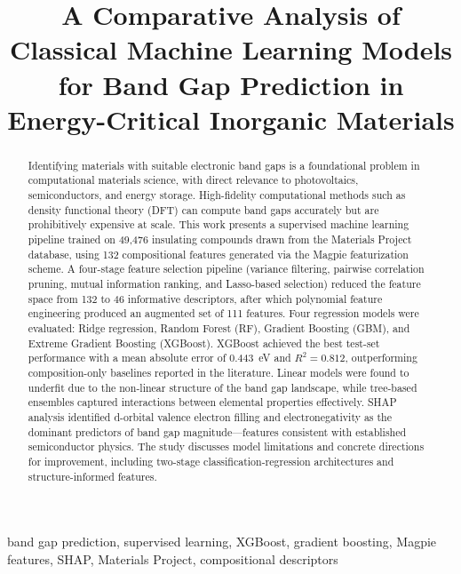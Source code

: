 \documentclass[conference]{IEEEtran}
\begin{document}
\title{A Comparative Analysis of Classical Machine Learning Models for Band Gap Prediction in Energy-Critical Inorganic Materials}

\author{
  \and
  \and
}


\maketitle

\begin{abstract}
Identifying materials with suitable electronic band gaps is a foundational problem in computational materials science, with direct relevance to photovoltaics, semiconductors, and energy storage. High-fidelity computational methods such as density functional theory (DFT) can compute band gaps accurately but are prohibitively expensive at scale. This work presents a supervised machine learning pipeline trained on 49,476 insulating compounds drawn from the Materials Project database, using 132 compositional features generated via the Magpie featurization scheme. A four-stage feature selection pipeline (variance filtering, pairwise correlation pruning, mutual information ranking, and Lasso-based selection) reduced the feature space from 132 to 46 informative descriptors, after which polynomial feature engineering produced an augmented set of 111 features. Four regression models were evaluated: Ridge regression, Random Forest (RF), Gradient Boosting (GBM), and Extreme Gradient Boosting (XGBoost). XGBoost achieved the best test-set performance with a mean absolute error of 0.443~eV and $R^2 = 0.812$, outperforming composition-only baselines reported in the literature. Linear models were found to underfit due to the non-linear structure of the band gap landscape, while tree-based ensembles captured interactions between elemental properties effectively. SHAP analysis identified d-orbital valence electron filling and electronegativity as the dominant predictors of band gap magnitude---features consistent with established semiconductor physics. The study discusses model limitations and concrete directions for improvement, including two-stage classification-regression architectures and structure-informed features.
\end{abstract}

\begin{IEEEkeywords}
band gap prediction, supervised learning, XGBoost, gradient boosting, Magpie features, SHAP, Materials Project, compositional descriptors
\end{IEEEkeywords}
\end{document}
